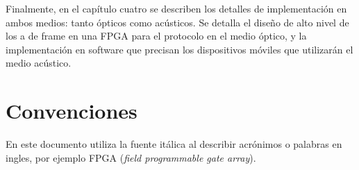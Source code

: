 Finalmente, en el capítulo cuatro se describen los detalles de implementación en ambos medios: tanto ópticos como acústicos. Se detalla el diseño de alto nivel de los a de frame en una FPGA para el protocolo en el medio óptico, y la implementación en software que precisan los dispositivos móviles que utilizarán el medio acústico.

\section{Convenciones}

En este documento utiliza la fuente itálica al describir acrónimos o palabras en ingles, por ejemplo FPGA (\textit{field programmable gate array}).